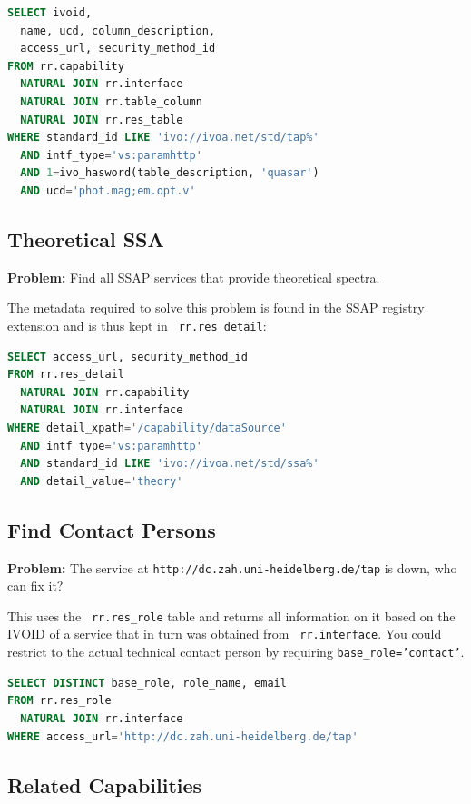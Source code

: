 \documentclass[11pt,a4paper]{ivoa}
\newcommand{\rtent}[1]{\texttt{\color{rtcolor} #1}}
\begin{document}
\begin{lstlisting}[language=SQL,flexiblecolumns=true]
SELECT ivoid, 
  name, ucd, column_description,
  access_url, security_method_id
FROM rr.capability 
  NATURAL JOIN rr.interface
  NATURAL JOIN rr.table_column
  NATURAL JOIN rr.res_table
WHERE standard_id LIKE 'ivo://ivoa.net/std/tap%'
  AND intf_type='vs:paramhttp'
  AND 1=ivo_hasword(table_description, 'quasar')
  AND ucd='phot.mag;em.opt.v'
\end{lstlisting}

\subsection{Theoretical SSA}

\textbf{Problem:} Find all SSAP services that
provide theoretical spectra.

The metadata required to solve this problem is found in the SSAP
registry extension and is thus kept in 
\rtent{rr.res\_detail}:


\begin{lstlisting}[language=SQL,flexiblecolumns=true]
SELECT access_url, security_method_id
FROM rr.res_detail 
  NATURAL JOIN rr.capability 
  NATURAL JOIN rr.interface 
WHERE detail_xpath='/capability/dataSource' 
  AND intf_type='vs:paramhttp'
  AND standard_id LIKE 'ivo://ivoa.net/std/ssa%'
  AND detail_value='theory'
\end{lstlisting}


\subsection{Find Contact Persons}

\textbf{Problem:} The service at
\texttt{http://dc.zah.uni-heidelberg.de/tap} is down, who can
fix it?

This uses the \rtent{rr.res\_role} table and returns all information on
it based on the IVOID of a service that in turn was obtained from
\rtent{rr.interface}.  You could restrict to the actual technical
contact person by requiring \texttt{base\_role='contact'}.


\begin{lstlisting}[language=SQL,flexiblecolumns=true]
SELECT DISTINCT base_role, role_name, email 
FROM rr.res_role 
  NATURAL JOIN rr.interface 
WHERE access_url='http://dc.zah.uni-heidelberg.de/tap'
\end{lstlisting}

\subsection{Related Capabilities}
\end{document}
